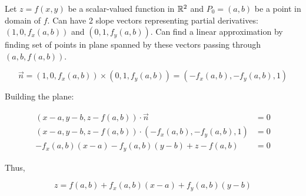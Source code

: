 Let $z=f(x,y)$ be a scalar-valued function in $\mathbb{R}^2$ and $P_0=(a,b)$ be a point in domain of $f$. Can have 2 slope vectors representing partial derivatives:
$(1,0,f_x(a,b))$ and $(0,1,f_y(a,b))$. Can find a linear approximation by finding set of points in plane spanned by these vectors passing through
$(a,b,f(a,b))$.

\[\vec{n}=(1,0,f_x(a,b))\times(0,1,f_y(a,b))=(-f_x(a,b),-f_y(a,b),1)\]

Building the plane:

\begin{align*}
    (x-a, y-b, z-f(a, b)) \cdot \vec{n} &=0 \\
    (x-a, y-b, z-f(a, b)) \cdot\left(-f_{x}(a, b),-f_{y}(a, b), 1\right) &=0 \\
    -f_{x}(a, b)(x-a)-f_{y}(a, b)(y-b)+z-f(a, b) &=0
\end{align*}

Thus,

\[z=f(a, b)+f_{x}(a, b)(x-a)+f_{y}(a, b)(y-b)\]